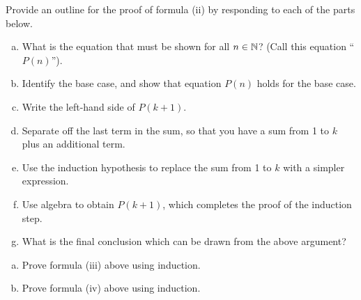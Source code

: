 \begin{exercise}
Provide an outline for the proof of formula (ii) by responding to each of the parts below.

\begin{enumerate}[(a)]
\item
What is the equation that must be shown  for all $n\in\mathbb{N}$?  (Call this equation ``$P(n)$'').
\item
Identify the base case, and show that equation $P(n)$  holds for the base case.
\item
Write the left-hand side of  $P( k+1)$.
\item
Separate off the last term in the sum, so that you have a sum from 1 to $k$ plus an additional term.
\item
Use the induction hypothesis to replace the sum from 1 to $k$ with a simpler expression.
\item
Use algebra to obtain $P(k+1)$, which completes the proof of the induction step. 
\item 
What is the final conclusion which can be drawn from the above argument?
\end{enumerate}

\end{exercise}

\begin{exercise}
\begin{enumerate}[(a)]
\item
Prove formula (iii) above using induction.
\item
Prove formula (iv) above using induction.
\end{enumerate}
\end{exercise}


%
%
%


